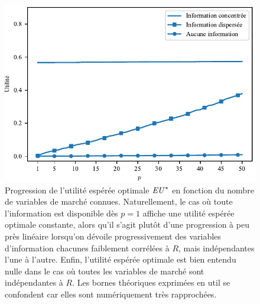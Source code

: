 \begin{figure}[h!]
  \centering
  \includegraphics[width=\textwidth]{../experiments/fig/pconst_euinforelative.pdf}
  \caption[Utilité espérée optimale en fonction de $p$]{Progression de l'utilité espérée
    optimale $\operatorname{\mbox{\textit{EU}}}^\star$ en fonction du nombre de variables de marché connues. Naturellement,
    le cas où toute l'information est disponible dès $p=1$ affiche une utilité espérée
    optimale constante, alors qu'il s'agit plutôt d'une progression à peu près linéaire
    lorsqu'on dévoile progressivement des variables d'information chacunes faiblement
    corrélées à $R$, mais indépendantes l'une à l'autre. Enfin, l'utilité espérée optimale
    est bien entendu nulle dans le cas où toutes les variables de marché sont
    indépendantes à $R$. Les bornes théoriques exprimées en util se confondent car elles
    sont numériquement très rapprochées.}
  \label{fig_pconst_euinforelative}
\end{figure}

